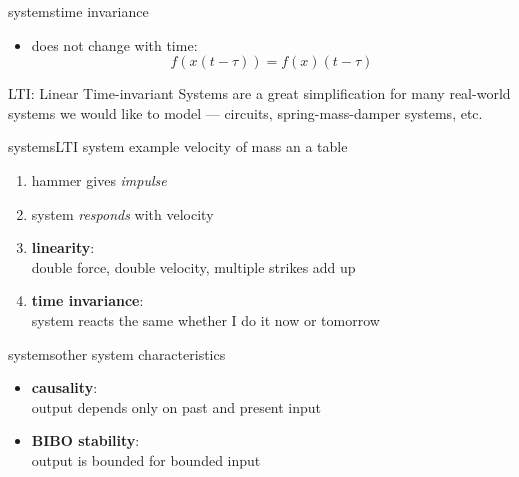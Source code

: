         \begin{frame}{systems}{time invariance}
            
            \begin{itemize}
                \item   does not change with time:
                    \[f\left(x(t-\tau)\right) = f(x)(t-\tau)\]
            \end{itemize}
            \pause
            \begin{block}{LTI: Linear Time-invariant Systems}
                are a great simplification for many real-world systems we would like to model --- circuits, spring-mass-damper systems, etc.
            \end{block}
        \end{frame}
        \begin{frame}{systems}{LTI system example}
            velocity of mass an a table
            \begin{enumerate}
                \item   hammer gives \textit{impulse}
                \item   system \textit{responds} with velocity
                \bigskip
                \item<2->[]   \textbf{linearity}:\\ double force, double velocity, multiple strikes add up
                \smallskip
                \item<2->[]   \textbf{time invariance}:\\ system reacts the same whether I do it now or tomorrow
            \end{enumerate}
        \end{frame}
        \begin{frame}{systems}{other system characteristics}
            \begin{itemize}
                \item   \textbf{causality}:\\ output depends only on past and present input
                \bigskip
                \item   \textbf{BIBO stability}:\\ output is bounded for bounded input
            \end{itemize}
        \end{frame}
